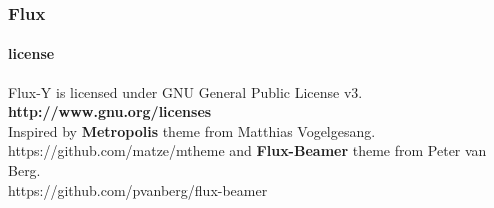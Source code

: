 \documentclass[9pt,aspectratio=169]{ctexbeamer}
\begin{document}
\begin{frame}
  \centering
  \frametitle{Flux}
  \framesubtitle{license}
  Flux-Y is licensed under GNU General Public License v3.\\[0.3cm]
    \centering\textbf{http://www.gnu.org/licenses}\\[0.3cm]
 Inspired by \textbf{Metropolis} theme from Matthias Vogelgesang.\\
 https://github.com/matze/mtheme and \textbf{Flux-Beamer} theme from Peter van Berg.\\
 https://github.com/pvanberg/flux-beamer
  
 \end{frame}
\end{document}

